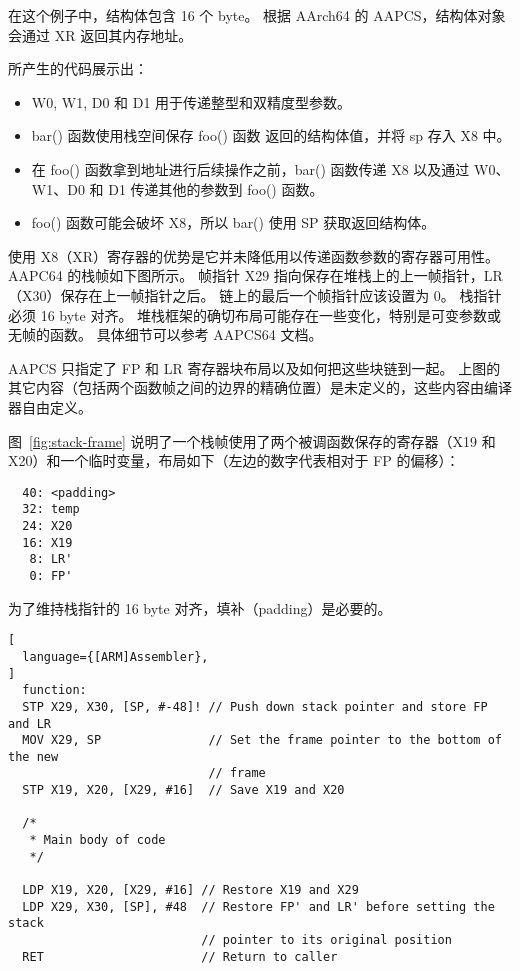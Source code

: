 在这个例子中，结构体包含 16 个 byte。
根据 AArch64 的 AAPCS，结构体对象会通过 XR 返回其内存地址。

所产生的代码展示出：

\begin{itemize}
  \item W0, W1, D0 和 D1 用于传递整型和双精度型参数。
  \item bar() 函数使用栈空间保存 foo() 函数 返回的结构体值，并将 sp 存入 X8 中。
  \item 在 foo() 函数拿到地址进行后续操作之前，bar() 函数传递 X8 以及通过 W0、W1、D0 和 D1 传递其他的参数到 foo() 函数。
  \item foo() 函数可能会破坏 X8，所以 bar() 使用 SP 获取返回结构体。
\end{itemize}

使用 X8（XR）寄存器的优势是它并未降低用以传递函数参数的寄存器可用性。
AAPC64 的栈帧如下图所示。
帧指针 X29 指向保存在堆栈上的上一帧指针，LR（X30）保存在上一帧指针之后。
链上的最后一个帧指针应该设置为 0。
栈指针必须 16 byte 对齐。
堆栈框架的确切布局可能存在一些变化，特别是可变参数或无帧的函数。
具体细节可以参考 AAPCS64 文档。


\begin{Tcbox}[title={Note}]
  AAPCS 只指定了 FP 和 LR 寄存器块布局以及如何把这些块链到一起。
  上图的其它内容（包括两个函数帧之间的边界的精确位置）是未定义的，这些内容由编译器自由定义。
\end{Tcbox}

图~\ref{fig:stack-frame} 说明了一个栈帧使用了两个被调函数保存的寄存器（X19 和 X20）和一个临时变量，布局如下（左边的数字代表相对于 FP 的偏移）：

\begin{lstlisting}
  40: <padding>
  32: temp
  24: X20
  16: X19
   8: LR'
   0: FP'
\end{lstlisting}

为了维持栈指针的 16 byte 对齐，填补（padding）是必要的。

\begin{lstlisting}[
  language={[ARM]Assembler},
]
  function:
  STP X29, X30, [SP, #-48]! // Push down stack pointer and store FP and LR
  MOV X29, SP               // Set the frame pointer to the bottom of the new
                            // frame
  STP X19, X20, [X29, #16]  // Save X19 and X20

  /*
   * Main body of code
   */

  LDP X19, X20, [X29, #16] // Restore X19 and X29
  LDP X29, X30, [SP], #48  // Restore FP' and LR' before setting the stack
                           // pointer to its original position
  RET                      // Return to caller
\end{lstlisting}

